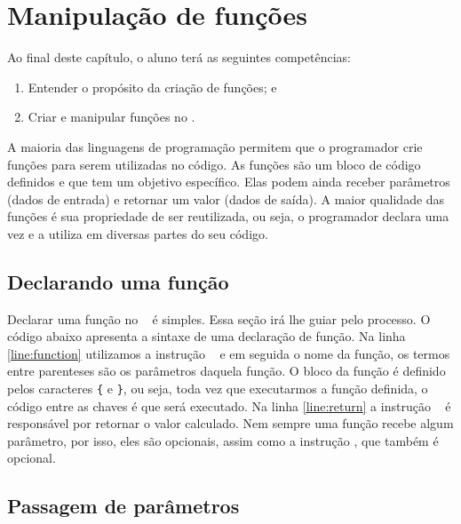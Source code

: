 \chapter{Manipulação de funções}
\label{manipulacao-de-funcoes}

Ao final deste capítulo, o aluno terá as seguintes competências:
\begin{enumerate}
    \item Entender o propósito da criação de funções; e
    \item Criar e manipular funções no \php.
\end{enumerate}

A maioria das linguagens de programação permitem que o programador crie 
funções para serem utilizadas no código. As funções são um bloco de código 
definidos e que tem um objetivo específico. Elas podem ainda receber 
parâmetros (dados de entrada) e retornar um valor (dados de saída). 
A maior qualidade das funções é sua propriedade de ser reutilizada, ou seja, 
o programador declara uma vez e a utiliza em diversas partes do seu código. 

\section{Declarando uma função}
\label{declarando-uma-funcao}

Declarar uma função no \php~ é simples. Essa seção irá lhe guiar pelo processo. 
O código abaixo apresenta a sintaxe de uma declaração de função. Na linha \ref{line:function} 
utilizamos a instrução \comandofunction~ e em seguida o nome da função, os termos 
entre parenteses são os parâmetros daquela função. O bloco da função é definido 
pelos caracteres \texttt{\{} e \texttt{\}}, ou seja, toda vez que executarmos a 
função definida, o código entre as chaves é que será executado. Na linha \ref{line:return} 
a instrução \comandoreturn~ é responsável por retornar 
o valor calculado. Nem sempre uma função recebe algum parâmetro, por isso, 
eles são opcionais, assim como a instrução \comandoreturn, que também é opcional.



\section{Passagem de parâmetros}
\label{passagem-de-parametros}

